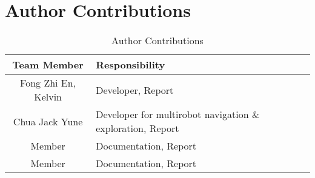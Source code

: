 \documentclass[a4paper,twocolumn]{article}
\begin{document}
\section{Author Contributions}
\begin{table}[h]
    \centering
    \begin{tabular}{c|p{}} %
    \hline\hline
    Team Member & Responsibility\\\hline\hline
    Fong Zhi En, Kelvin & Developer, Report \\ 
    Chua Jack Yune & Developer for multirobot navigation \& exploration, Report \\
    Member & Documentation, Report \\
    Member & Documentation, Report \\
    \hline\hline
    \end{tabular}
    \caption{Author Contributions}
    \label{tab:my_label}
\end{table}

\printbibliography
\end{document}
